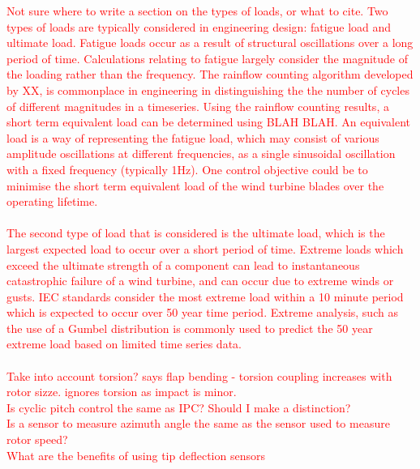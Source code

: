 \textcolor{red}{Not sure where to write a section on the types of loads, or what to cite.
Two types of loads are typically considered in engineering design: fatigue load and ultimate load. Fatigue loads occur as a result of structural oscillations over a long period of time. Calculations relating to fatigue largely consider the magnitude of the loading rather than the frequency. The rainflow counting algorithm developed by XX, is commonplace in engineering in distinguishing the the number of cycles of different magnitudes in a timeseries. Using the rainflow counting results, a short term equivalent load can be determined using BLAH BLAH. An equivalent load is a way of representing the fatigue load, which may consist of various amplitude oscillations at different frequencies, as a single sinusoidal oscillation with a fixed frequency (typically 1Hz). One control objective could be to minimise the short term equivalent load of the wind turbine blades over the operating lifetime.
\\~\\ 
The second type of load that is considered is the ultimate load, which is the largest expected load to occur over a short period of time. Extreme loads which exceed the ultimate strength of a component can lead to instantaneous catastrophic failure of a wind turbine, and can occur due to extreme winds or gusts. IEC standards consider the most extreme load within a 10 minute period which is expected to occur over 50 year time period. Extreme analysis, such as the use of a Gumbel distribution is commonly used to predict the 50 year extreme load based on limited time series data.}
\\~\\
\textcolor{red}{Take into account torsion?
\citet{7_Berg} says flap bending - torsion coupling increases with rotor sizze. ignores torsion as impact is minor. }
\\\textcolor{red}{Is cyclic pitch control the same as IPC? Should I make a distinction?}
\\
\textcolor{red}{Is a sensor to measure azimuth angle the same as the sensor used to measure rotor speed? }\\
\textcolor{red}{What are the benefits of using tip deflection sensors}